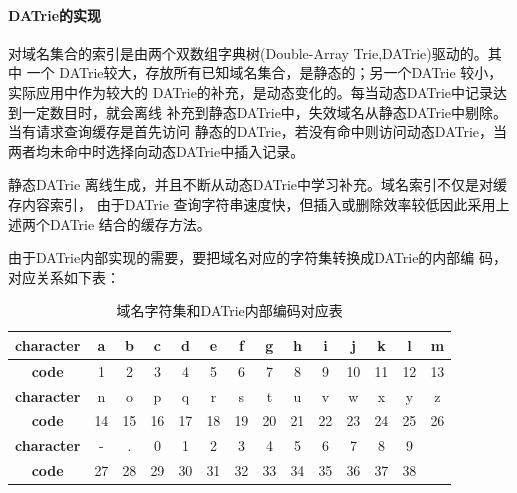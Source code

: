 \paragraph{DATrie的实现\\[5pt]}
	对域名集合的索引是由两个双数组字典树(Double-Array Trie,DATrie)驱动的。其中
	一个 DATrie较大，存放所有已知域名集合，是静态的；另一个DATrie 较小，实际应用中作为较大的
	DATrie的补充，是动态变化的。每当动态DATrie中记录达到一定数目时，就会离线
	补充到静态DATrie中，失效域名从静态DATrie中剔除。当有请求查询缓存是首先访问
	静态的DATrie，若没有命中则访问动态DATrie，当两者均未命中时选择向动态DATrie中插入记录。
	\par
	 {静态DATrie 离线生成，并且不断从动态DATrie中学习补充。域名索引不仅是对缓存内容索引，
	 由于DATrie 查询字符串速度快，但插入或删除效率较低因此采用上述两个DATrie
	 结合的缓存方法。 }
	 \par{由于DATrie内部实现的需要，要把域名对应的字符集转换成DATrie的内部编
	 码，对应关系如下表：}

\begin{table}[H]
\centering
\begin{tabular}{*{14}{|c}|}
\hline
\textbf{character}&a&b&c&d&e&f&g&h&i&j&k&l&m\\
\hline
\textbf{code}&1&2&3&4&5&6&7&8&9&10&11&12&13\\
\hline
\textbf{character}&n&o&p&q&r&s&t&u&v&w&x&y&z\\
\hline
\textbf{code}&14&15&16&17&18&19&20&21&22&23&24&25&26\\
\hline
\textbf{character}&-&.&0&1&2&3&4&5&6&7&8&9\\
\textbf{code}&27&28&29&30&31&32&33&34&35&36&37&38\\
\end{tabular}
\caption{域名字符集和DATrie内部编码对应表}
\end{table}


